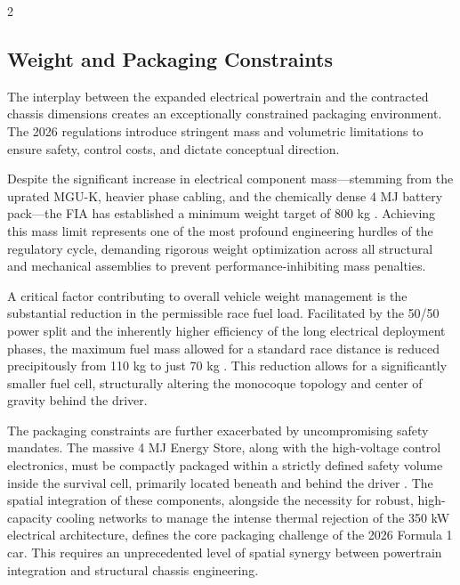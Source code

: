 \begin{multicols}{2}
\subsection{Weight and Packaging Constraints}

The interplay between the expanded electrical powertrain and the contracted chassis dimensions creates an exceptionally constrained packaging environment. The 2026 regulations introduce stringent mass and volumetric limitations to ensure safety, control costs, and dictate conceptual direction.

Despite the significant increase in electrical component mass—stemming from the uprated MGU-K, heavier phase cabling, and the chemically dense 4 MJ battery pack—the FIA has established a minimum weight target of 800 kg \cite{FIA_2026_Chassis_Regulations}. Achieving this mass limit represents one of the most profound engineering hurdles of the regulatory cycle, demanding rigorous weight optimization across all structural and mechanical assemblies to prevent performance-inhibiting mass penalties.

A critical factor contributing to overall vehicle weight management is the substantial reduction in the permissible race fuel load. Facilitated by the 50/50 power split and the inherently higher efficiency of the long electrical deployment phases, the maximum fuel mass allowed for a standard race distance is reduced precipitously from 110 kg to just 70 kg \cite{FIA_2026_PU_Regulations}. This reduction allows for a significantly smaller fuel cell, structurally altering the monocoque topology and center of gravity behind the driver.

The packaging constraints are further exacerbated by uncompromising safety mandates. The massive 4 MJ Energy Store, along with the high-voltage control electronics, must be compactly packaged within a strictly defined safety volume inside the survival cell, primarily located beneath and behind the driver \cite{FIA_2026_Technical_Regulations}. The spatial integration of these components, alongside the necessity for robust, high-capacity cooling networks to manage the intense thermal rejection of the 350 kW electrical architecture, defines the core packaging challenge of the 2026 Formula 1 car. This requires an unprecedented level of spatial synergy between powertrain integration and structural chassis engineering.
\end{multicols}
